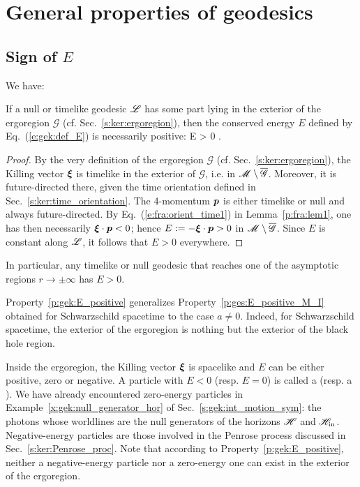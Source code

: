 
\section{General properties of geodesics} \label{s:ges:general_prop}

\subsection{Sign of $E$} \label{s:gek:sign_E}

We have:
\begin{prop}
\label{p:gek:E_positive}
If a null or timelike geodesic $\mathscr{L}$ has some part lying in the exterior of the ergoregion $\mathscr{G}$ (cf. Sec.~\ref{s:ker:ergoregion}),
then the conserved energy $E$ defined by Eq.~(\ref{e:gek:def_E}) is necessarily
positive:
\be \label{e:gek:E_positive}
    \Li \not\subset {}\quad \Longrightarrow \quad E > 0 .
\ee
\end{prop}
\begin{proof}
By the very definition of the ergoregion $\mathscr{G}$ (cf. Sec.~\ref{s:ker:ergoregion}),
the Killing vector $\bm{\xi}$ is timelike in the exterior of $\mathscr{G}$, i.e.
in $\mathscr{M}\setminus\overline{\mathscr{G}}$. Moreover, it is
future-directed there, given the time orientation defined in Sec.~\ref{s:ker:time_orientation}.
The 4-momentum $\bm{p}$ is either timelike or null and always future-directed.
By Eq.~(\ref{e:fra:orient_time1}) in Lemma~\ref{p:fra:lem1}, one has then necessarily $\bm{\xi}\cdot\bm{p} < 0$; hence
$E := - \bm{\xi}\cdot\bm{p} > 0$ in $\mathscr{M}\setminus \overline{\mathscr{G}}$. Since $E$ is constant along $\mathscr{L}$, it
follows that $E > 0$ everywhere.
\end{proof}
In particular, any timelike or null geodesic that reaches one of the asymptotic regions
$r\to\pm\infty$ has $E>0$.
\begin{remark}
Property~\ref{p:gek:E_positive} generalizes Property~\ref{p:ges:E_positive_M_I}
obtained for Schwarzschild spacetime to
the case $a\not=0$. Indeed, for Schwarzschild spacetime, the exterior of the ergoregion
is nothing but the exterior of the black hole region.
\end{remark}

Inside the ergoregion, the Killing vector $\bm{\xi}$ is spacelike and $E$ can be
either positive, zero or negative.
A particle with $E<0$ (resp. $E=0$) is called a
(resp. a ).
We have already encountered zero-energy particles in Example~\ref{x:gek:null_generator_hor} of Sec.~\ref{s:gek:int_motion_sym}: the photons whose worldlines are the null generators of the horizons $\mathscr{H}$
and $\mathscr{H}_{\rm in}$.
Negative-energy particles are those involved in the Penrose process discussed in Sec.~\ref{s:ker:Penrose_proc}.
Note that according to Property~\ref{p:gek:E_positive}, neither a negative-energy particle nor a zero-energy one can exist in the exterior of the ergoregion.

